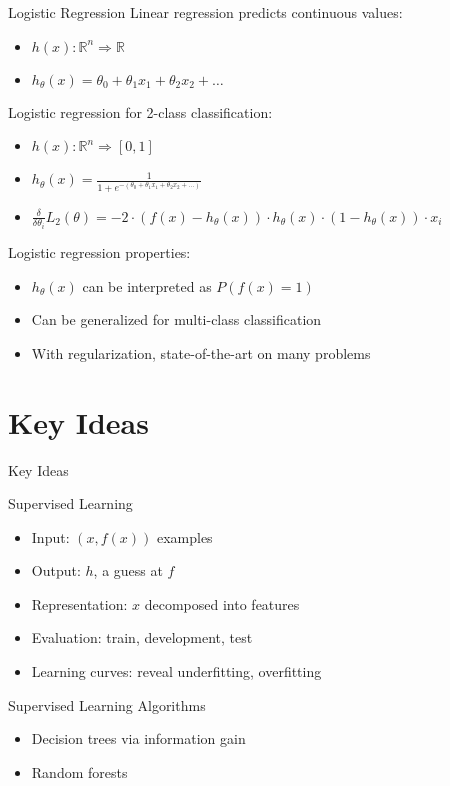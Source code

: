 \documentclass[14pt]{beamer}
\begin{document}
\begin{frame}[label=logistic-regression]{Logistic Regression}
Linear regression predicts continuous values:
\begin{itemize}
\item $h(x): \mathbb{R}^n \Rightarrow \mathbb{R}$
\item $h_{\theta}(x) = \theta_0 + \theta_1 x_1 + \theta_2 x_2 + \ldots$
\end{itemize}
\pause
Logistic regression for 2-class classification:
\begin{itemize}
\item $h(x): \mathbb{R}^n \Rightarrow [0,1]$
\item $\displaystyle h_{\theta}(x) = \frac{1}{1 + e^{-(\theta_0 + \theta_1 x_1 + \theta_2 x_2 + \ldots)}}$
\pause
\item $\displaystyle \frac{\delta}{\delta \theta_i} L_2(\theta) = -2 \cdot ( f(x) - h_{\theta}(x) ) \cdot h_{\theta}(x) \cdot ( 1 - h_{\theta}(x) ) \cdot x_i $
\end{itemize}
\medskip
\pause
Logistic regression properties:
\begin{itemize}
\item $h_{\theta}(x)$ can be interpreted as $P(f(x) = 1)$
\item Can be generalized for multi-class classification
\item With regularization, state-of-the-art on many problems
\end{itemize}
\end{frame}

\part{Key Ideas}

\begin{frame}{Key Ideas}
\begin{block}{Supervised Learning}
\begin{itemize}
\item Input: $(x, f(x))$ examples
\item Output: $h$, a guess at $f$
\item Representation: $x$ decomposed into features
\item Evaluation: train, development, test
\item Learning curves: reveal underfitting, overfitting
\end{itemize}
\end{block}
\begin{block}{Supervised Learning Algorithms}
\begin{itemize}
\item Decision trees via information gain
\item Random forests
\end{itemize}
\end{block}
\end{frame}
\end{document}
